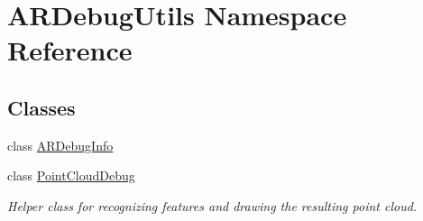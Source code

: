 \hypertarget{namespace_a_r_debug_utils}{}\section{A\+R\+Debug\+Utils Namespace Reference}
\label{namespace_a_r_debug_utils}
\subsection*{Classes}
\begin{DoxyCompactItemize}
\item 
class \hyperlink{class_a_r_debug_utils_1_1_a_r_debug_info}{A\+R\+Debug\+Info}
\item 
class \hyperlink{class_a_r_debug_utils_1_1_point_cloud_debug}{Point\+Cloud\+Debug}
\begin{DoxyCompactList}\small\item\em Helper class for recognizing features and drawing the resulting point cloud. \end{DoxyCompactList}\end{DoxyCompactItemize}
